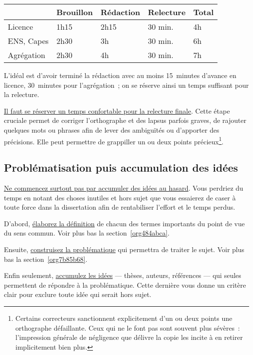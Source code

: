 \documentclass[a4paper,12pt]{article}
\begin{document}
\begin{center}
\begin{tabular}{|l|l|l|l|l|}
\hline
 & Brouillon & Rédaction & Relecture & Total\\
\hline
Licence & 1h15 & 2h15 & 30 min. & 4h\\
ENS, Capes & 2h30 & 3h & 30 min. & 6h\\
Agrégation & 2h30 & 4h & 30 min. & 7h\\
\hline
\end{tabular}
\end{center}

L'idéal est d'avoir terminé la rédaction avec au moins 15 minutes
d'avance en licence, 30 minutes pour l'agrégation ; on se réserve ainsi
un temps suffisant pour la relecture. 

\uline{Il faut se réserver un temps confortable pour la relecture finale}.
Cette étape cruciale permet de corriger l'orthographe et des lapsus
parfois graves, de rajouter quelques mots ou phrases afin de lever des
ambiguïtés ou d'apporter des précisions. Elle peut permettre de
grappiller un ou deux points précieux\footnote{Certains correcteurs sanctionnent explicitement d'un ou deux points
une orthographe défaillante. Ceux qui ne le font pas sont souvent
plus sévères : l'impression générale de négligence que délivre la
copie les incite à en retirer implicitement bien plus.}.

\subsection{Problématisation puis accumulation des idées}
\label{sec:orgb85a12c}

\uline{Ne commencez surtout pas par accumuler des idées au hasard}. Vous
perdriez du temps en notant des choses inutiles et hors sujet que vous
essaierez de caser à toute force dans la dissertation afin de
rentabiliser l'effort et le temps perdus.

D'abord, \uline{élaborez la définition} de chacun des termes importants du
point de vue du sens commun. Voir plus bas la section \ref{org484abca}.

Ensuite, \uline{construisez la problématique} qui permettra de traiter le
sujet. Voir plus bas la section \ref{org7b85b68}.

Enfin seulement, \uline{accumulez les idées} --- thèses, auteurs, références
--- qui seules permettent de répondre à la problématique. Cette dernière
vous donne un critère clair pour exclure toute idée qui serait hors
sujet.
\end{document}
